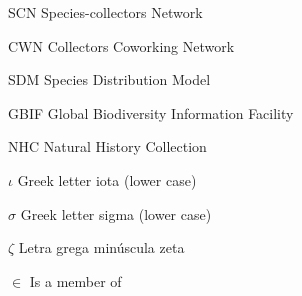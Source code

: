 \documentclass[
	12pt,				%
	openright,			%
	oneside,			%
	a4paper,			%
	sumario=tradicional,%
	french,				%
	spanish,			%
	brazil,				%
    english
	]{abntex2}
\begin{document}
%

%

\listoffigures*
\cleardoublepage

\listoftables*
\cleardoublepage

\begin{siglas}
  \item[SCN] Species-collectors Network
  \item[CWN] Collectors Coworking Network
  \item[SDM] Species Distribution Model
  \item[GBIF] Global Biodiversity Information Facility
  \item[NHC] Natural History Collection
  
\end{siglas}

\begin{simbolos}
  \item[$ \iota $] Greek letter iota (lower case)
  \item[$ \sigma $] Greek letter sigma (lower case)
  \item[$ \zeta $] Letra grega minúscula zeta
  \item[$ \in $] Is a member of
\end{simbolos}

\tableofcontents*
\cleardoublepage

\textual
\end{document}
